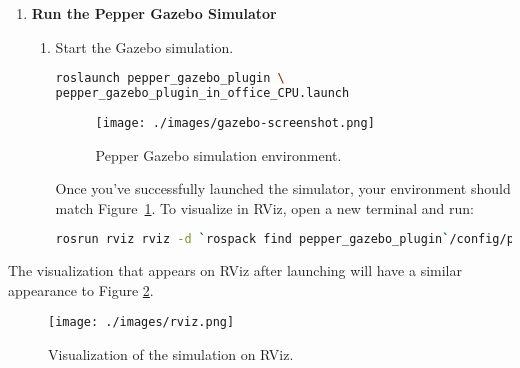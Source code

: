 \documentclass{CSSRforAfrica}
\begin{document}
{\begin{enumerate}
\begin{enumerate}
\item Make ROS environment variables automatically added every time a new shell is launched.
\begin{lstlisting}[style=withoutNumbering, language=bash]
echo "source $HOME/workspace/pepper_sim_ws/devel/setup.bash" >> \
$HOME/.bashrc
\end{lstlisting}

\begin{lstlisting}[style=withoutNumbering, language=bash]
source $HOME/.bashrc
\end{lstlisting}

\end{enumerate}
\item \textbf{Run the Pepper Gazebo Simulator}
\begin{enumerate}[leftmargin=0pt,labelsep=0.5em]
\item Start the Gazebo simulation.
\begin{lstlisting}[style=withoutNumbering, language=bash]
roslaunch pepper_gazebo_plugin \
pepper_gazebo_plugin_in_office_CPU.launch
\end{lstlisting}

\begin{figure}[!hbpt]
\centering
\texttt{[image: ./images/gazebo-screenshot.png]}
\caption{Pepper Gazebo simulation environment.}
\label{fig:gazebo-sim}
\end{figure}

\noindent Once you’ve successfully launched the simulator, your environment should match Figure~\ref{fig:gazebo-sim}. To visualize in RViz, open a new terminal and run:

\begin{lstlisting}[style=withoutNumbering, language=bash]
rosrun rviz rviz -d `rospack find pepper_gazebo_plugin`/config/pepper_sensors.rviz
\end{lstlisting}
\end{enumerate}
\end{enumerate}

\newpage
The visualization that appears on RViz after launching will have a similar appearance to Figure \ref{fig:rviz}.

\begin{figure}[!hbpt]
\centering
\texttt{[image: ./images/rviz.png]}
\caption{Visualization of the simulation on RViz.}
\label{fig:rviz}
\end{figure}



\clearpage
}
\end{document}

